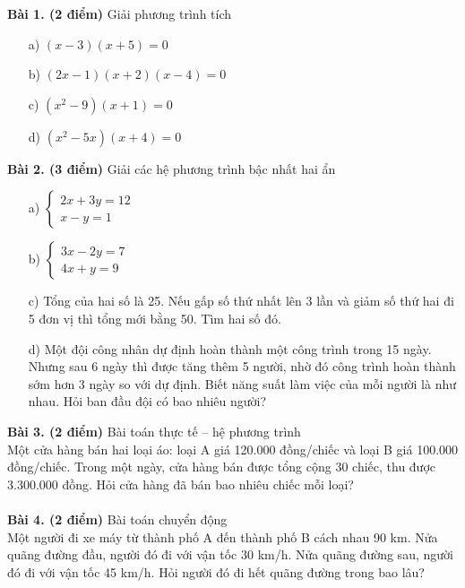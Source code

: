 \documentclass[12pt]{article}
\begin{document}
\begin{center}
    \begin{minipage}{0.9\textwidth}
        \textbf{Bài 1. (2 điểm)} Giải phương trình tích
        \begin{itemize}
            \item[a)] $(x - 3)(x + 5) = 0$
            \item[b)] $(2x - 1)(x + 2)(x - 4) = 0$
            \item[c)] $(x^2 - 9)(x + 1) = 0$
            \item[d)] $(x^2 - 5x)(x + 4) = 0$
        \end{itemize}
        \textbf{Bài 2. (3 điểm)} Giải các hệ phương trình bậc nhất hai ẩn
        \begin{itemize}
            \item[a)]
                  $\begin{cases}
                          2x + 3y = 12 \\
                          x - y = 1
                      \end{cases}$
            \item[b)]
                  $\begin{cases}
                          3x - 2y = 7 \\
                          4x + y = 9
                      \end{cases}$
            \item[c)] Tổng của hai số là 25. Nếu gấp số thứ nhất lên 3 lần và giảm số thứ hai đi 5 đơn vị thì tổng mới bằng 50. Tìm hai số đó.
            \item[d)]  Một đội công nhân dự định hoàn thành một công trình trong 15 ngày. Nhưng sau 6 ngày thì được tăng thêm 5 người, nhờ đó công trình hoàn thành sớm hơn 3 ngày so với dự định. Biết năng suất làm việc của mỗi người là như nhau. Hỏi ban đầu đội có bao nhiêu người?
        \end{itemize}
        \textbf{Bài 3. (2 điểm)} Bài toán thực tế – hệ phương trình \\
        Một cửa hàng bán hai loại áo: loại A giá 120.000 đồng/chiếc và loại B giá 100.000 đồng/chiếc. Trong một ngày, cửa hàng bán được tổng cộng 30 chiếc, thu được 3.300.000 đồng. Hỏi cửa hàng đã bán bao nhiêu chiếc mỗi loại? \\
        \\
        \textbf{Bài 4. (2 điểm)} Bài toán chuyển động \\
        Một người đi xe máy từ thành phố A đến thành phố B cách nhau 90 km. Nửa quãng đường đầu, người đó đi với vận tốc 30 km/h. Nửa quãng đường sau, người đó đi với vận tốc 45 km/h. Hỏi người đó đi hết quãng đường trong bao lâu? \\

\end{minipage}
\end{center}
\end{document}
